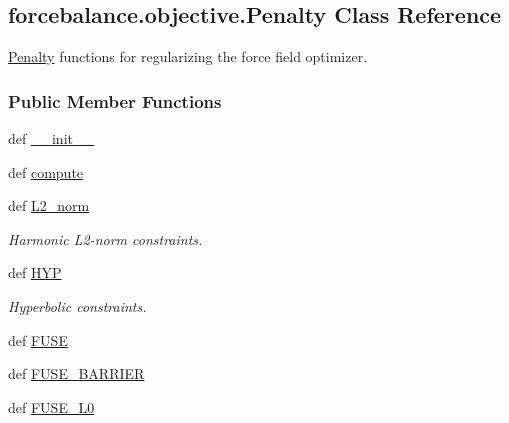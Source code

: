 \hypertarget{classforcebalance_1_1objective_1_1Penalty}{\subsection{forcebalance.\-objective.\-Penalty \-Class \-Reference}
\label{classforcebalance_1_1objective_1_1Penalty}
}


\hyperlink{classforcebalance_1_1objective_1_1Penalty}{\-Penalty} functions for regularizing the force field optimizer.  


\subsubsection*{\-Public \-Member \-Functions}
\begin{DoxyCompactItemize}
\item 
def \hyperlink{classforcebalance_1_1objective_1_1Penalty_aa2df9566dd3b054b48ddac60eae56f1f}{\-\_\-\-\_\-init\-\_\-\-\_\-}
\item 
def \hyperlink{classforcebalance_1_1objective_1_1Penalty_a844137de5dfb3e7907c37769d1306495}{compute}
\item 
def \hyperlink{classforcebalance_1_1objective_1_1Penalty_ab59d5beafbab0918b7c3e0c61ece41a3}{\-L2\-\_\-norm}
\begin{DoxyCompactList}\small\item\em \-Harmonic \-L2-\/norm constraints. \end{DoxyCompactList}\item 
def \hyperlink{classforcebalance_1_1objective_1_1Penalty_a1f3fa55d1c27db3eca0af41bb57c04ef}{\-H\-Y\-P}
\begin{DoxyCompactList}\small\item\em \-Hyperbolic constraints. \end{DoxyCompactList}\item 
def \hyperlink{classforcebalance_1_1objective_1_1Penalty_aafc1810e03e4e3f2ca1569588a8189d4}{\-F\-U\-S\-E}
\item 
def \hyperlink{classforcebalance_1_1objective_1_1Penalty_a9badc0a78d23016aa3dcc2d610e2e16c}{\-F\-U\-S\-E\-\_\-\-B\-A\-R\-R\-I\-E\-R}
\item 
def \hyperlink{classforcebalance_1_1objective_1_1Penalty_ab54cfe22065a5aa22766e16cc8cb90aa}{\-F\-U\-S\-E\-\_\-\-L0}
\end{DoxyCompactItemize}
